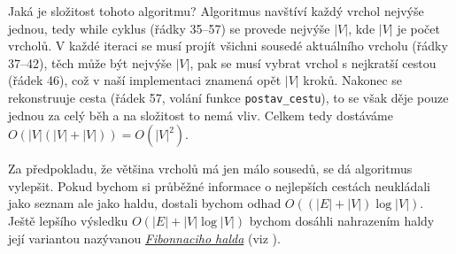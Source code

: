 
Jaká je složitost tohoto algoritmu? Algoritmus navštíví každý vrchol nejvýše jednou,
tedy while cyklus (řádky 35--57) se provede nejvýše $|V|$, kde $|V|$ je počet vrcholů.
V každé iteraci se musí projít všichni sousedé aktuálního vrcholu (řádky 37--42),
těch může být nejvýše $|V|$, pak se musí vybrat vrchol s nejkratší cestou (řádek 46),
což v naší implementaci znamená opět $|V|$ kroků. Nakonec se rekonstruuje cesta (řádek
57, volání funkce {\tt postav\_cestu}), to se však děje pouze jednou za celý běh a
na složitost to nemá vliv. Celkem tedy dostáváme $O(|V|(|V|+|V|)) = O(|V|^2)$. 

Za předpokladu, že většina vrcholů má jen málo sousedů, se dá algoritmus vylepšit.
Pokud bychom si průběžné informace o nejlepších cestách neukládali jako seznam
ale jako haldu, dostali bychom odhad $O((|E|+|V|)\log|V|)$. Ještě lepšího výsledku
$O(|E| + |V|\log|V|)$ bychom dosáhli nahrazením haldy její variantou nazývanou \emph{\href{http://en.wikipedia.org/wiki/Fibonacci_heap}{Fibonnaciho halda}} (viz \cite{Tarjan:1984}).



\ifx\ucebnice\undefined

\fi